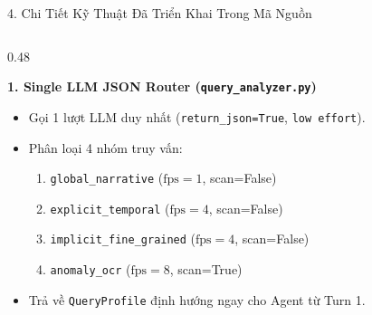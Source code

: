 \documentclass[aspectratio=169, 10pt]{beamer}
\begin{document}
\begin{frame}{4. Chi Tiết Kỹ Thuật Đã Triển Khai Trong Mã Nguồn}
    \begin{columns}[T]
        \begin{column}{0.48\textwidth}
            \begin{block}{\textbf{1. Single LLM JSON Router (\texttt{query\_analyzer.py})}}
                \begin{itemize}
                    \item Gọi 1 lượt LLM duy nhất (\texttt{return\_json=True}, \texttt{low effort}).
                    \item Phân loại 4 nhóm truy vấn:
                    \begin{enumerate}\footnotesize
                        \item \texttt{global\_narrative} ($\text{fps}=1$, scan=False)
                        \item \texttt{explicit\_temporal} ($\text{fps}=4$, scan=False)
                        \item \texttt{implicit\_fine\_grained} ($\text{fps}=4$, scan=False)
                        \item \texttt{anomaly\_ocr} ($\text{fps}=8$, scan=True)
                    \end{enumerate}
                    \item Trả về \texttt{QueryProfile} định hướng ngay cho Agent từ Turn 1.
                \end{itemize}
            \end{block}
        \end{column}


\end{columns}
\end{frame}
\end{document}
